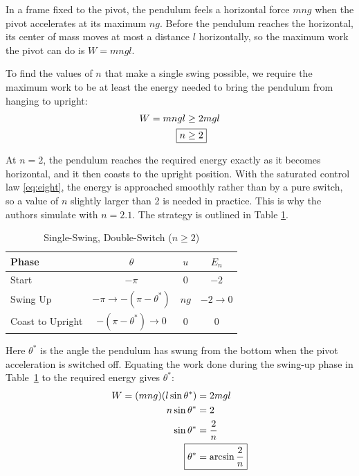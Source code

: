 \documentclass{article}
\begin{document}
In a frame fixed to the pivot, the pendulum feels a horizontal force $mng$ when the pivot accelerates at its maximum $ng$. Before the pendulum reaches the horizontal, its center of mass moves at most a distance $l$ horizontally, so the maximum work the pivot can do is $W = mngl$.

To find the values of $n$ that make a single swing possible, we require the maximum work to be at least the energy needed to bring the pendulum from hanging to upright:
\begin{align*}
    W = mngl & \geq 2mgl \\
    \Aboxed{n & \geq 2}
\end{align*}

At $n = 2$, the pendulum reaches the required energy exactly as it becomes horizontal, and it then coasts to the upright position. With the saturated control law \eqref{eq:eight}, the energy is approached smoothly rather than by a pure switch, so a value of $n$ slightly larger than 2 is needed in practice. This is why the authors simulate with $n = 2.1$. The strategy is outlined in Table \ref{tab:ssds}.

\begin{table}[ht]
  \centering
  \caption{Single-Swing, Double-Switch ($n \geq 2$)}
  \label{tab:ssds}
  \begin{tabular}{|l|c|c|c|}
    \hline
    Phase & $\theta$ & $u$ & $E_n$ \\
    \hline
    Start & $-\pi$ & $0$ & $-2$ \\
    Swing Up & $-\pi \rightarrow -(\pi - \theta^*)$ & $ng$ & $-2 \rightarrow 0$ \\
    Coast to Upright & $-(\pi - \theta^*) \rightarrow 0$ & $0$ & $0$ \\
    \hline
  \end{tabular}
\end{table}

Here $\theta^*$ is the angle the pendulum has swung from the bottom when the pivot acceleration is switched off. Equating the work done during the swing-up phase in Table~\ref{tab:ssds} to the required energy gives $\theta^*$:
\begin{align*}
    W = (mng)(l\sin{\theta^*}) &= 2mgl \\
    n\sin{\theta^*} &= 2 \\
    \sin{\theta^*} &= \frac{2}{n} \\
    \Aboxed{\theta^* &= \arcsin{\frac{2}{n}}}
\end{align*}
\end{document}
